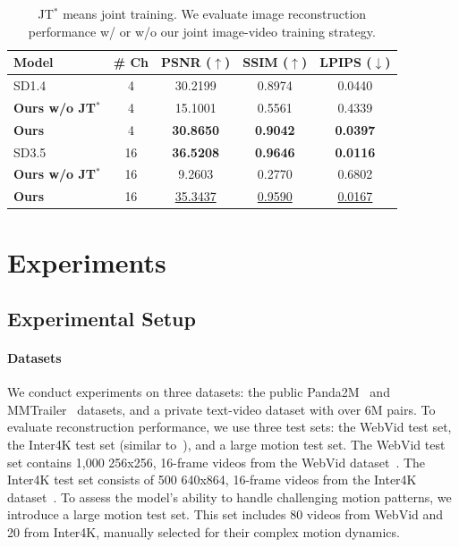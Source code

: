 \begin{table}[ht]
    \centering
    \setlength\tabcolsep{4pt} %
    \renewcommand{\arraystretch}{1} %
    \begin{tabular}{lcccc}
        \toprule
        \textbf{Model} & \textbf{\# Ch} & \textbf{PSNR ($\uparrow$)} & \textbf{SSIM ($\uparrow$)} & \textbf{LPIPS ($\downarrow$)} \\
        \midrule
        SD1.4~\cite{blattmann2023stable} & 4 & 30.2199 & 0.8974 & 0.0440 \\
        \textbf{Ours w/o JT$^*$} & 4 & 15.1001 & 0.5561 & 0.4339 \\
        \textbf{Ours} & 4 & \textbf{30.8650} & \textbf{0.9042} & \textbf{0.0397} \\
        \midrule
        SD3.5~\cite{sd35}  & 16 & \textbf{36.5208} & \textbf{0.9646} & \textbf{0.0116} \\
        \textbf{Ours w/o JT$^*$} & 16 & 9.2603 & 0.2770 & 0.6802 \\
        \textbf{Ours} & 16 & \underline{35.3437} & \underline{0.9590} & \underline{0.0167} \\
        \bottomrule
    \end{tabular}
    \caption{JT$^*$ means joint training. We evaluate image reconstruction performance w/ or w/o our joint image-video training strategy.}
    \label{tab:ablation_joint}
    \vspace{-3mm}
\end{table}



\section{Experiments}

\subsection{Experimental Setup}
\paragraph{Datasets} 
We conduct experiments on three datasets: the public Panda2M~\cite{chen2024panda} and MMTrailer~\cite{chi2024mmtrailmultimodaltrailervideo} datasets, and a private text-video dataset with over 6M pairs.
To evaluate reconstruction performance, we use three test sets: the WebVid test set, the Inter4K test set (similar to~\cite{zhao2024cv}), and a large motion test set. The WebVid test set contains 1,000 256x256, 16-frame videos from the WebVid dataset~\cite{bain2021frozen}. The Inter4K test set consists of 500 640x864, 16-frame videos from the Inter4K dataset~\cite{inter4K}.
To assess the model's ability to handle challenging motion patterns, we introduce a large motion test set. This set includes 80 videos from WebVid and 20 from Inter4K, manually selected for their complex motion dynamics.


